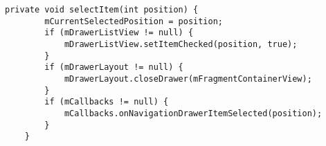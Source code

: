 \begin{lstlisting}[style=custom_JAVA]
	private void selectItem(int position) {
        mCurrentSelectedPosition = position;
        if (mDrawerListView != null) {
            mDrawerListView.setItemChecked(position, true);
        }
        if (mDrawerLayout != null) {
            mDrawerLayout.closeDrawer(mFragmentContainerView);
        }
        if (mCallbacks != null) {
            mCallbacks.onNavigationDrawerItemSelected(position);
        }
    }
\end{lstlisting}